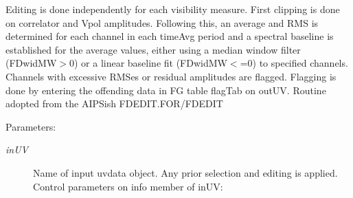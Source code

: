 Editing is done independently for each visibility measure. First clipping is done on correlator and Vpol amplitudes. Following this, an average and RMS is determined for each channel in each time\-Avg period and a spectral baseline is established for the average values, either using a median window filter (FDwid\-MW$>$0) or a linear baseline fit (FDwid\-MW$<$=0) to specified channels. Channels with excessive RMSes or residual amplitudes are flagged. Flagging is done by entering the offending data in FG table flag\-Tab on out\-UV. Routine adopted from the AIPSish FDEDIT.FOR/FDEDIT \begin{Desc}
\item[Parameters:]
\begin{description}
\item[{\em in\-UV}]Name of input uvdata object. Any prior selection and editing is applied. Control parameters on info member of in\-UV: \begin{itemize}

\end{itemize}
\end{description}
\end{Desc}
